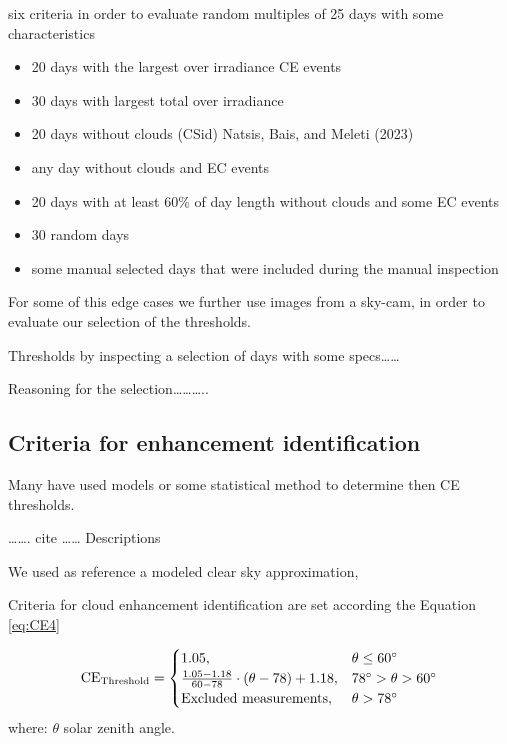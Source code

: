 \documentclass[
]{article}
\providecommand{\tightlist}{%
  \setlength{\itemsep}{0pt}\setlength{\parskip}{0pt}}
\begin{document}
six criteria in order to evaluate random multiples of 25 days with some characteristics

\begin{itemize}
\tightlist
\item
  20 days with the largest over irradiance CE events
\item
  30 days with largest total over irradiance
\item
  20 days without clouds (CSid) Natsis, Bais, and Meleti (2023)
\item
  any day without clouds and EC events
\item
  20 days with at least 60\% of day length without clouds and some EC events
\item
  30 random days
\item
  some manual selected days that were included during the manual inspection
\end{itemize}

For some of this edge cases we further use images from a sky-cam, in order to evaluate our selection of the thresholds.

Thresholds by inspecting a selection of days with some specs\ldots\ldots{}

Reasoning for the selection\ldots\ldots\ldots..

\hypertarget{criteria-for-enhancement-identification}{%
\subsection{Criteria for enhancement identification}\label{criteria-for-enhancement-identification}}

Many have used models or some statistical method to determine then CE thresholds.

\ldots\ldots. cite \ldots\ldots{} Descriptions

We used as reference a modeled clear sky approximation,

Criteria for cloud enhancement identification are set according the Equation \ref{eq:CE4}

\begin{equation}
\text{CE}_\text{Threshold} = \begin{cases}
1.05, & \text{$\theta \leq 60^\circ$}\\
\frac{1.05 - 1.18}{60 - 78} \cdot (\theta- 78) + 1.18 , & \text{$ 78^\circ > \theta > 60^\circ$}\\
\text{Excluded measurements}, & \theta > 78^\circ
\end{cases}\label{eq:CE4}
\end{equation}
where: \(\theta\) solar zenith angle.
\end{document}
